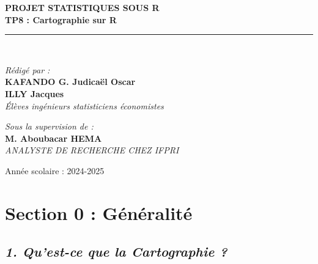 \documentclass[
]{article}
\begin{document}
\begin{titlepage}
\begin{center}
        \textbf{\LARGE PROJET STATISTIQUES SOUS R }\\[0.3cm]
        \textbf{\Huge \color{black} \textsf{TP8 : Cartographie sur R}}\\[0.2cm]
        \rule{\linewidth}{0.2mm} \\[0.5cm]
        
        \begin{minipage}{0.5\textwidth}
    \begin{flushleft} \large
        \emph{\textsf{Rédigé par :}}\\
        \textbf{KAFANDO G. Judicaël Oscar}\\
        \textbf{ILLY Jacques}\\
        \textit{Élèves ingénieurs statisticiens économistes}
    \end{flushleft}
\end{minipage}
        \hfill
        \begin{minipage}{0.4\textwidth}
            \begin{flushright} \large
                \emph{\textsf{Sous la supervision de :}} \\
                \textbf{M. Aboubacar HEMA}\\
                \textit{ANALYSTE DE RECHERCHE CHEZ IFPRI }
            \end{flushright}
        \end{minipage}

        \vfill

        {\large \textsf{Année scolaire : 2024-2025}}\\[0.5cm]
        
    \end{center}
\end{titlepage}

\newpage
\tableofcontents
\newpage

\section{\texorpdfstring{\textbf{Section 0 :
Généralité}}{Section 0 : Généralité}}\label{section-0-guxe9nuxe9ralituxe9}

\subsection{\texorpdfstring{\emph{1. Qu'est-ce que la Cartographie
?}}{1. Qu'est-ce que la Cartographie ?}}\label{quest-ce-que-la-cartographie}
\end{document}
